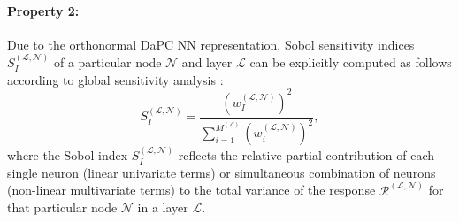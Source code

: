 \documentclass[a4paper,fleqn]{article}
\newcommand{\rw}[1]{\textcolor{blue}{#1}}
\renewcommand{\rw}[1]{#1}
\begin{document}
\paragraph{Property 2:}
Due to the orthonormal DaPC NN representation, Sobol \cite{sobol1990sensitivity} sensitivity indices  $S^{(\mathcal{L},\mathcal{N})}_{I}$ of a particular node $\mathcal{N}$ and layer $\mathcal{L}$ can be explicitly computed as follows according to global sensitivity analysis \rw{\cite{oladyshkin2012global,SUDRET2008964}}: 
\begin{equation}
 S^{(\mathcal{L},\mathcal{N})}_{I}= \frac{\left(w^{(\mathcal{L},\mathcal{N})}_{I}\right)^2}{\sum_{i=1}^{M^{(\mathcal{L})}}\left(w^{(\mathcal{L},\mathcal{N})}_{i}\right)^2},
\end{equation}
where the Sobol index $S^{(\mathcal{L},\mathcal{N})}_{I}$ reflects the relative partial contribution of each single neuron (linear \rw{univariate} terms) or simultaneous combination of neurons (non-linear \rw{multivariate} terms) to the total variance of the response $\mathcal{R}^{(\mathcal{L},\mathcal{N})}$ for that particular node $\mathcal{N}$ in a layer $\mathcal{L}$.
\end{document}
